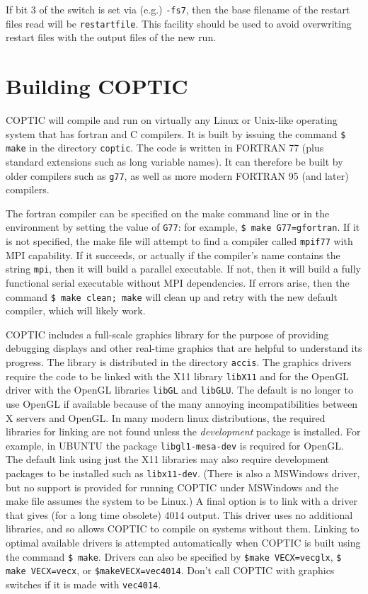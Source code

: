\documentclass[12pt]{article}
\begin{document}
If bit 3 of the switch is set via (e.g.) \verb!-fs7!, then the base
filename of the restart files read will be \verb!restartfile!. This
facility should be used to avoid overwriting restart files with the
output files of the new run.

\section{Building COPTIC}\label{building}

COPTIC will compile and run on virtually any Linux or Unix-like
operating system that has fortran and C compilers. It is built by
issuing the command \verb!$ make! in the directory \verb!coptic!. The
code is written in FORTRAN 77 (plus standard extensions such as long
variable names). It can therefore be built by older compilers such as
\verb!g77!, as well as more modern FORTRAN 95 (and later) compilers.

The fortran compiler can be specified on the make command line or in
the environment by setting the value of \verb!G77!: for example,
\verb!$ make G77=gfortran!.  If it is not specified, the make file
will attempt to find a compiler called \verb!mpif77! with MPI
capability.  If it succeeds, or actually if the compiler's name
contains the string \verb!mpi!, then it will build a parallel
executable. If not, then it will build a fully functional serial
executable without MPI dependencies. If errors arise, then the command
\verb!$ make clean; make! will clean up and retry with the new default
compiler, which will likely work.

COPTIC includes a full-scale graphics library for the purpose of
providing debugging displays and other real-time graphics that are
helpful to understand its progress. The library is distributed in the
directory \verb!accis!. The graphics drivers require the code to be
linked with the X11 library \verb!libX11! and for the OpenGL driver
with the OpenGL libraries \verb!libGL! and \verb!libGLU!. The default
is no longer to use OpenGL if available because of the many annoying
incompatibilities between X servers and OpenGL. In many modern linux
distributions, the required libraries for linking are not found unless
the \emph{development} package is installed. For example, in UBUNTU
the package \verb!libgl1-mesa-dev!  is required for OpenGL. The
default link using just the X11 libraries may also require development
packages to be installed such as \verb!libx11-dev!. (There is also a
MSWindows driver, but no support is provided for running COPTIC under
MSWindows and the make file assumes the system to be Linux.) A final
option is to link with a driver that gives (for a long time obsolete)
4014 output. This driver uses no additional libraries, and so allows
COPTIC to compile on systems without them. Linking to optimal
available drivers is attempted automatically when COPTIC is built
using the command
\verb!$ make!.  Drivers can also be specified by
\verb!$make VECX=vecglx!, \verb!$ make VECX=vecx!, or
\verb!$makeVECX=vec4014!. 
Don't call COPTIC with graphics switches if it is made
with \verb!vec4014!.
\end{document}
